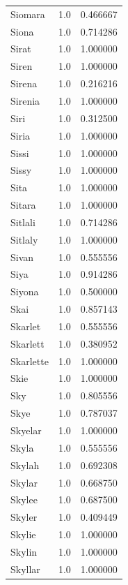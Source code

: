 \documentclass[
  letterpaper,
  DIV=11,
  numbers=noendperiod]{scrreprt}
\begin{document}
\begin{tabular}{lrr}
Siomara         &   1.0 &   0.466667 \\
Siona           &   1.0 &   0.714286 \\
Sirat           &   1.0 &   1.000000 \\
Siren           &   1.0 &   1.000000 \\
Sirena          &   1.0 &   0.216216 \\
Sirenia         &   1.0 &   1.000000 \\
Siri            &   1.0 &   0.312500 \\
Siria           &   1.0 &   1.000000 \\
Sissi           &   1.0 &   1.000000 \\
Sissy           &   1.0 &   1.000000 \\
Sita            &   1.0 &   1.000000 \\
Sitara          &   1.0 &   1.000000 \\
Sitlali         &   1.0 &   0.714286 \\
Sitlaly         &   1.0 &   1.000000 \\
Sivan           &   1.0 &   0.555556 \\
Siya            &   1.0 &   0.914286 \\
Siyona          &   1.0 &   0.500000 \\
Skai            &   1.0 &   0.857143 \\
Skarlet         &   1.0 &   0.555556 \\
Skarlett        &   1.0 &   0.380952 \\
Skarlette       &   1.0 &   1.000000 \\
Skie            &   1.0 &   1.000000 \\
Sky             &   1.0 &   0.805556 \\
Skye            &   1.0 &   0.787037 \\
Skyelar         &   1.0 &   1.000000 \\
Skyla           &   1.0 &   0.555556 \\
Skylah          &   1.0 &   0.692308 \\
Skylar          &   1.0 &   0.668750 \\
Skylee          &   1.0 &   0.687500 \\
Skyler          &   1.0 &   0.409449 \\
Skylie          &   1.0 &   1.000000 \\
Skylin          &   1.0 &   1.000000 \\
Skyllar         &   1.0 &   1.000000 \\

\end{tabular}
\end{document}
